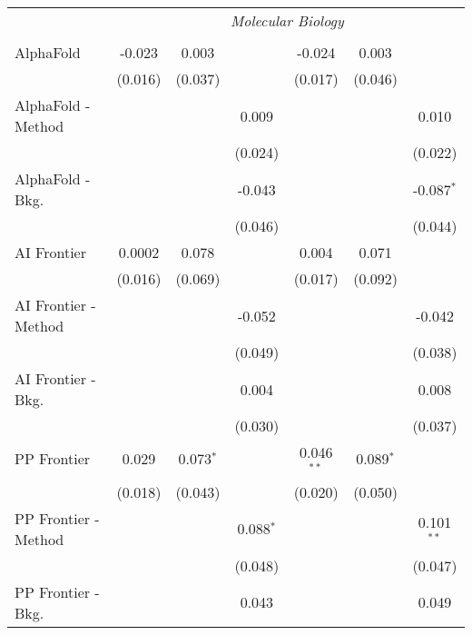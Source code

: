 \begin{tabular}{lcccccc}
 & \multicolumn{6}{c}{\textit{Molecular Biology}} \\ \\
   AlphaFold            & -0.023  & 0.003       &              & -0.024       & 0.003        &   \\   
                        & (0.016) & (0.037)     &              & (0.017)      & (0.046)      &   \\   
   AlphaFold - Method   &         &             & 0.009        &              &              & 0.010\\   
                        &         &             & (0.024)      &              &              & (0.022)\\   
   AlphaFold - Bkg.     &         &             & -0.043       &              &              & -0.087$^{*}$\\   
                        &         &             & (0.046)      &              &              & (0.044)\\   
   AI Frontier          & 0.0002  & 0.078       &              & 0.004        & 0.071        &   \\   
                        & (0.016) & (0.069)     &              & (0.017)      & (0.092)      &   \\   
   AI Frontier - Method &         &             & -0.052       &              &              & -0.042\\   
                        &         &             & (0.049)      &              &              & (0.038)\\   
   AI Frontier - Bkg.   &         &             & 0.004        &              &              & 0.008\\   
                        &         &             & (0.030)      &              &              & (0.037)\\   
   PP Frontier          & 0.029   & 0.073$^{*}$ &              & 0.046$^{**}$ & 0.089$^{*}$  &   \\   
                        & (0.018) & (0.043)     &              & (0.020)      & (0.050)      &   \\   
   PP Frontier - Method &         &             & 0.088$^{*}$  &              &              & 0.101$^{**}$\\   
                        &         &             & (0.048)      &              &              & (0.047)\\   
   PP Frontier - Bkg.   &         &             & 0.043        &              &              & 0.049\\   

\end{tabular}
